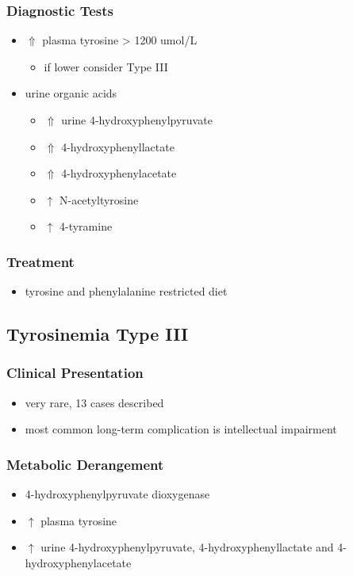 \documentclass{scrartcl}
\begin{document}
\subsubsection{Diagnostic Tests}
\label{sec:org8cbffe6}
\begin{itemize}
\item \(\Uparrow\) plasma tyrosine > 1200 umol/L
\begin{itemize}
\item if lower consider Type III
\end{itemize}
\item urine organic acids
\begin{itemize}
\item \(\Uparrow\) urine 4-hydroxyphenylpyruvate
\item \(\Uparrow\) 4-hydroxyphenyllactate
\item \(\Uparrow\) 4-hydroxyphenylacetate
\item \(\uparrow\) N-acetyltyrosine
\item \(\uparrow\) 4-tyramine
\end{itemize}
\end{itemize}

\subsubsection{Treatment}
\label{sec:orgde4d7bf}
\begin{itemize}
\item tyrosine and phenylalanine restricted diet
\end{itemize}

\subsection{Tyrosinemia Type III}
\label{sec:org2a155f1}
\subsubsection{Clinical Presentation}
\label{sec:orgcd82869}
\begin{itemize}
\item very rare, 13 cases described
\item most common long-term complication is intellectual impairment
\end{itemize}
\subsubsection{Metabolic Derangement}
\label{sec:org740937e}
\begin{itemize}
\item 4-hydroxyphenylpyruvate dioxygenase
\end{itemize}
\begin{itemize}
\item \(\uparrow\) plasma tyrosine
\item \(\uparrow\) urine 4-hydroxyphenylpyruvate, 4-hydroxyphenyllactate and 4-hydroxyphenylacetate
\end{itemize}
\end{document}
